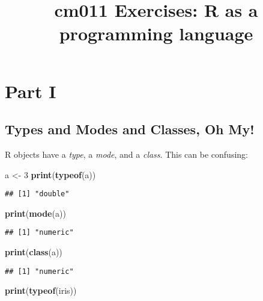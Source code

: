 \documentclass[]{article}
\title{cm011 Exercises: R as a programming language}
\author{}
\date{}
\newenvironment{Shaded}{\begin{snugshade}}{\end{snugshade}}
\newcommand{\KeywordTok}[1]{\textcolor[rgb]{0.13,0.29,0.53}{\textbf{#1}}}
\newcommand{\DecValTok}[1]{\textcolor[rgb]{0.00,0.00,0.81}{#1}}
\newcommand{\StringTok}[1]{\textcolor[rgb]{0.31,0.60,0.02}{#1}}
\newcommand{\NormalTok}[1]{#1}
\begin{document}
\maketitle

\section{Part I}\label{part-i}

\subsection{Types and Modes and Classes, Oh
My!}\label{types-and-modes-and-classes-oh-my}

R objects have a \emph{type}, a \emph{mode}, and a \emph{class}. This
can be confusing:

\begin{Shaded}
\begin{Highlighting}[]
\NormalTok{a <-}\StringTok{ }\DecValTok{3}
\KeywordTok{print}\NormalTok{(}\KeywordTok{typeof}\NormalTok{(a))}
\end{Highlighting}
\end{Shaded}

\begin{verbatim}
## [1] "double"
\end{verbatim}

\begin{Shaded}
\begin{Highlighting}[]
\KeywordTok{print}\NormalTok{(}\KeywordTok{mode}\NormalTok{(a))}
\end{Highlighting}
\end{Shaded}

\begin{verbatim}
## [1] "numeric"
\end{verbatim}

\begin{Shaded}
\begin{Highlighting}[]
\KeywordTok{print}\NormalTok{(}\KeywordTok{class}\NormalTok{(a))}
\end{Highlighting}
\end{Shaded}

\begin{verbatim}
## [1] "numeric"
\end{verbatim}

\begin{Shaded}
\begin{Highlighting}[]
\KeywordTok{print}\NormalTok{(}\KeywordTok{typeof}\NormalTok{(iris))}
\end{Highlighting}
\end{Shaded}
\end{document}
